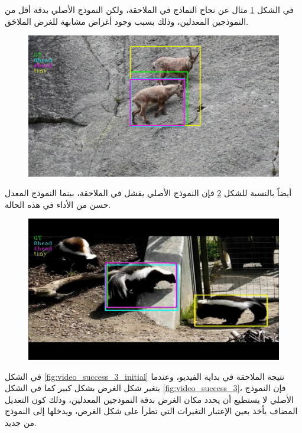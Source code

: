 في الشكل
\ref{fig:video_success_1}
مثال عن نجاح النماذج في الملاحقة، ولكن النموذج الأصلي بدقة أقل من النموذجين المعدلين، وذلك بسبب وجود أغراض مشابهة للغرض الملاحَق.
\begin{figure}[H]
	\centerline{\includegraphics[width=\textwidth]{images/results/success/project_52}}
	\caption{}
	\label{fig:video_success_1}
\end{figure}
أيضاً بالنسبة للشكل
\ref{fig:video_success_2}
فإن النموذج الأصلي يفشل في الملاحقة، بينما النموذج المعدل حسن من الأداء في هذه الحالة.
\begin{figure}[H]
	\centerline{\includegraphics[width=\textwidth]{images/results/success/project_161}}
	\caption{}
	\label{fig:video_success_2}
\end{figure}
في الشكل 
\ref{fig:video_success_3_initial}
نتيجة الملاحقة في بداية الفيديو، وعندما يتغير شكل الغرض بشكل كبير كما في الشكل 
\ref{fig:video_success_3}،
فإن النموذج الأصلي لا يستطيع أن يحدد مكان الغرض بدقة النموذجين المعدلين، وذلك كون التعديل المضاف يأخذ بعين الإعتبار التغيرات التي تطرأ على شكل الغرض، ويدخلها إلى النموذج من جديد.
